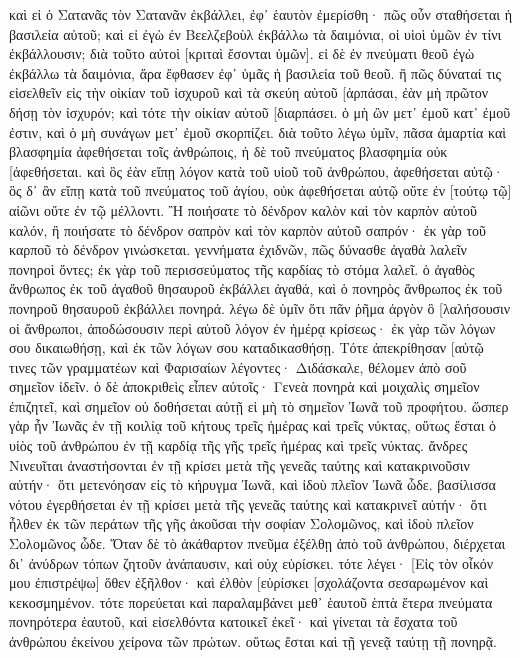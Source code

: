 καὶ εἰ ὁ Σατανᾶς τὸν Σατανᾶν ἐκβάλλει, ἐφ᾽ ἑαυτὸν ἐμερίσθη· πῶς οὖν σταθήσεται ἡ βασιλεία αὐτοῦ; 
καὶ εἰ ἐγὼ ἐν Βεελζεβοὺλ ἐκβάλλω τὰ δαιμόνια, οἱ υἱοὶ ὑμῶν ἐν τίνι ἐκβάλλουσιν; διὰ τοῦτο αὐτοὶ [κριταὶ ἔσονται ὑμῶν]. 
εἰ δὲ ἐν πνεύματι θεοῦ ἐγὼ ἐκβάλλω τὰ δαιμόνια, ἄρα ἔφθασεν ἐφ᾽ ὑμᾶς ἡ βασιλεία τοῦ θεοῦ. 
ἢ πῶς δύναταί τις εἰσελθεῖν εἰς τὴν οἰκίαν τοῦ ἰσχυροῦ καὶ τὰ σκεύη αὐτοῦ [ἁρπάσαι, ἐὰν μὴ πρῶτον δήσῃ τὸν ἰσχυρόν; καὶ τότε τὴν οἰκίαν αὐτοῦ [διαρπάσει. 
ὁ μὴ ὢν μετ᾽ ἐμοῦ κατ᾽ ἐμοῦ ἐστιν, καὶ ὁ μὴ συνάγων μετ᾽ ἐμοῦ σκορπίζει. 
διὰ τοῦτο λέγω ὑμῖν, πᾶσα ἁμαρτία καὶ βλασφημία ἀφεθήσεται τοῖς ἀνθρώποις, ἡ δὲ τοῦ πνεύματος βλασφημία οὐκ [ἀφεθήσεται. 
καὶ ὃς ἐὰν εἴπῃ λόγον κατὰ τοῦ υἱοῦ τοῦ ἀνθρώπου, ἀφεθήσεται αὐτῷ· ὃς δ᾽ ἂν εἴπῃ κατὰ τοῦ πνεύματος τοῦ ἁγίου, οὐκ ἀφεθήσεται αὐτῷ οὔτε ἐν [τούτῳ τῷ] αἰῶνι οὔτε ἐν τῷ μέλλοντι. 
Ἢ ποιήσατε τὸ δένδρον καλὸν καὶ τὸν καρπὸν αὐτοῦ καλόν, ἢ ποιήσατε τὸ δένδρον σαπρὸν καὶ τὸν καρπὸν αὐτοῦ σαπρόν· ἐκ γὰρ τοῦ καρποῦ τὸ δένδρον γινώσκεται. 
γεννήματα ἐχιδνῶν, πῶς δύνασθε ἀγαθὰ λαλεῖν πονηροὶ ὄντες; ἐκ γὰρ τοῦ περισσεύματος τῆς καρδίας τὸ στόμα λαλεῖ. 
ὁ ἀγαθὸς ἄνθρωπος ἐκ τοῦ ἀγαθοῦ θησαυροῦ ἐκβάλλει ἀγαθά, καὶ ὁ πονηρὸς ἄνθρωπος ἐκ τοῦ πονηροῦ θησαυροῦ ἐκβάλλει πονηρά. 
λέγω δὲ ὑμῖν ὅτι πᾶν ῥῆμα ἀργὸν ὃ [λαλήσουσιν οἱ ἄνθρωποι, ἀποδώσουσιν περὶ αὐτοῦ λόγον ἐν ἡμέρᾳ κρίσεως· 
ἐκ γὰρ τῶν λόγων σου δικαιωθήσῃ, καὶ ἐκ τῶν λόγων σου καταδικασθήσῃ. 
Τότε ἀπεκρίθησαν [αὐτῷ τινες τῶν γραμματέων καὶ Φαρισαίων λέγοντες· Διδάσκαλε, θέλομεν ἀπὸ σοῦ σημεῖον ἰδεῖν. 
ὁ δὲ ἀποκριθεὶς εἶπεν αὐτοῖς· Γενεὰ πονηρὰ καὶ μοιχαλὶς σημεῖον ἐπιζητεῖ, καὶ σημεῖον οὐ δοθήσεται αὐτῇ εἰ μὴ τὸ σημεῖον Ἰωνᾶ τοῦ προφήτου. 
ὥσπερ γὰρ ἦν Ἰωνᾶς ἐν τῇ κοιλίᾳ τοῦ κήτους τρεῖς ἡμέρας καὶ τρεῖς νύκτας, οὕτως ἔσται ὁ υἱὸς τοῦ ἀνθρώπου ἐν τῇ καρδίᾳ τῆς γῆς τρεῖς ἡμέρας καὶ τρεῖς νύκτας. 
ἄνδρες Νινευῖται ἀναστήσονται ἐν τῇ κρίσει μετὰ τῆς γενεᾶς ταύτης καὶ κατακρινοῦσιν αὐτήν· ὅτι μετενόησαν εἰς τὸ κήρυγμα Ἰωνᾶ, καὶ ἰδοὺ πλεῖον Ἰωνᾶ ὧδε. 
βασίλισσα νότου ἐγερθήσεται ἐν τῇ κρίσει μετὰ τῆς γενεᾶς ταύτης καὶ κατακρινεῖ αὐτήν· ὅτι ἦλθεν ἐκ τῶν περάτων τῆς γῆς ἀκοῦσαι τὴν σοφίαν Σολομῶνος, καὶ ἰδοὺ πλεῖον Σολομῶνος ὧδε. 
Ὅταν δὲ τὸ ἀκάθαρτον πνεῦμα ἐξέλθῃ ἀπὸ τοῦ ἀνθρώπου, διέρχεται δι᾽ ἀνύδρων τόπων ζητοῦν ἀνάπαυσιν, καὶ οὐχ εὑρίσκει. 
τότε λέγει· [Εἰς τὸν οἶκόν μου ἐπιστρέψω] ὅθεν ἐξῆλθον· καὶ ἐλθὸν [εὑρίσκει [σχολάζοντα σεσαρωμένον καὶ κεκοσμημένον. 
τότε πορεύεται καὶ παραλαμβάνει μεθ᾽ ἑαυτοῦ ἑπτὰ ἕτερα πνεύματα πονηρότερα ἑαυτοῦ, καὶ εἰσελθόντα κατοικεῖ ἐκεῖ· καὶ γίνεται τὰ ἔσχατα τοῦ ἀνθρώπου ἐκείνου χείρονα τῶν πρώτων. οὕτως ἔσται καὶ τῇ γενεᾷ ταύτῃ τῇ πονηρᾷ. 
